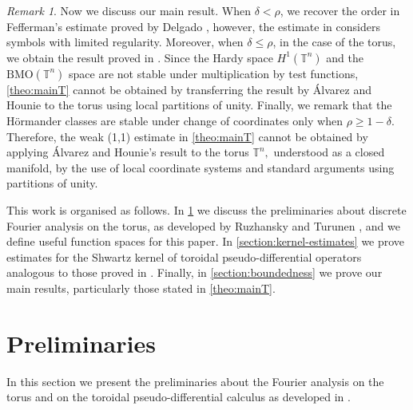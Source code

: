 \documentclass[12pt, reqno]{amsart}
\theoremstyle{definition}
\theoremstyle{remark}
\newtheorem{remark}[theorem]{Remark}
\numberwithin{equation}{section}
\begin{document}
\begin{remark}
    Now we discuss our main result. When $\delta < \rho$, we recover the order in Fefferman's estimate proved by Delgado \cite{delgado}, however, the estimate in \cite{delgado} considers symbols with limited regularity. Moreover, when $\delta \leq \rho$, in the case of the torus, we obtain the result proved in \cite{cardona-ruzhansky-subelliptic}. Since the Hardy space $H^1(\mathbb{T}^n)$ and the $\mathrm{BMO}(\mathbb{T}^n)$ space are not stable under multiplication by test functions, \cref{theo:mainT} cannot be obtained by  transferring the result by \'Alvarez and Hounie \cite{alvarez-hounie} to the torus using local partitions of unity. Finally, we remark that the Hörmander classes are stable under change of coordinates only when $\rho \geq  1 -\delta$. Therefore, the weak (1,1) estimate in \cref{theo:mainT} cannot be obtained by applying \'Alvarez and Hounie's result to the torus $\mathbb{T}^n,$ understood as a closed manifold, by the use of local coordinate systems and standard arguments using  partitions of unity.
\end{remark}
This  work is organised as follows. In \cref{section:prelims} we discuss the preliminaries about discrete Fourier analysis on the torus, as developed by Ruzhansky and Turunen \cite{ruzhansky-turunen}, and we define useful function spaces for this paper. In \cref{section:kernel-estimates} we prove estimates for the Shwartz kernel of toroidal pseudo-differential operators analogous to those proved in \cite{alvarez-hounie}. Finally, in \cref{section:boundedness} we prove our main results, particularly those stated in \cref{theo:mainT}.


\section{Preliminaries}
\label{section:prelims}
In this section we present the preliminaries about the Fourier analysis on the torus and on the toroidal pseudo-differential calculus as developed in \cite{ruzhansky-turunen}.
\end{document}

